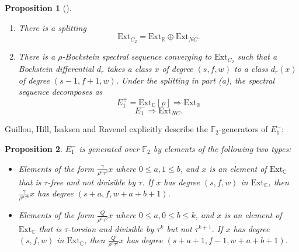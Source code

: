 \documentclass[psamsfonts]{amsart}
\newcommand{\C}{\mathbb C}
\newcommand{\F}{\mathbb F}
\newcommand{\Ext}{\mathrm {Ext}}
\newtheorem{theorem}{Theorem}[section]
\newtheorem{proposition}[theorem]{Proposition}
\theoremstyle{definition}
\theoremstyle{remark}
\newcommand{\R}{\mathbb{R}}
\numberwithin{equation}{section}
\begin{document}



\begin{proposition}[\cite{GHIR}]\label{E_2 page splitting}
~\begin{enumerate}
    \item There is a splitting
    \[\Ext_{C_2}=\Ext_\R\oplus \Ext_{NC}.\]
    \item There is a $\rho$-Bockstein spectral sequence converging to $\Ext_{C_2}$ such that a Bockstein differential $d_r$ takes a class $x$ of degree $(s,f,w)$ to a class $d_r(x)$ of degree $(s-1, f+1, w)$.
    Under the splitting in part (a), the spectral sequence decomposes as
    \[E_1^+=\Ext_\C[\rho]\Rightarrow \Ext_\R\]
    \[E_1^-\Rightarrow \Ext_{NC}.\] 
\end{enumerate}
\end{proposition}

Guillou, Hill, Isaksen and Ravenel \cite[\S3]{GHIR} explicitly describe the $\F_2$-generators of $E_1^-$:
\begin{proposition} \label{prop:E1minus}
$E_1^-$ is generated over $\F_2$ by elements of the following two types:
\begin{itemize}
    \item Elements of the form $\frac{\gamma}{\rho^a \tau^b}x$ where $0\leq a, 1\leq b$, and $x$ is an element of $\Ext_\C$ that is $\tau$-free and not divisible by $\tau$. If $x$ has degree $(s, f, w)$ in $\Ext_\C$, then $\frac{\gamma}{\rho^a \tau^b}x$ has degree $(s+a,f, w+a+b+1)$.
    \item Elements of the form $\frac{Q}{\rho^a \tau^b}x$ where $0\leq a, 0\leq b\leq k$, and $x$ is an element of $\Ext_\C$ that is $\tau$-torsion and divisible by $\tau^k$ but not $\tau^{k+1}$. If $x$ has degree $(s, f, w)$ in $\Ext_\C$, then $\frac{Q}{\rho^a \tau^b}x$ has degree $(s+a+1,f-1, w+a+b+1)$.
\end{itemize}
\end{proposition}
\end{document}
